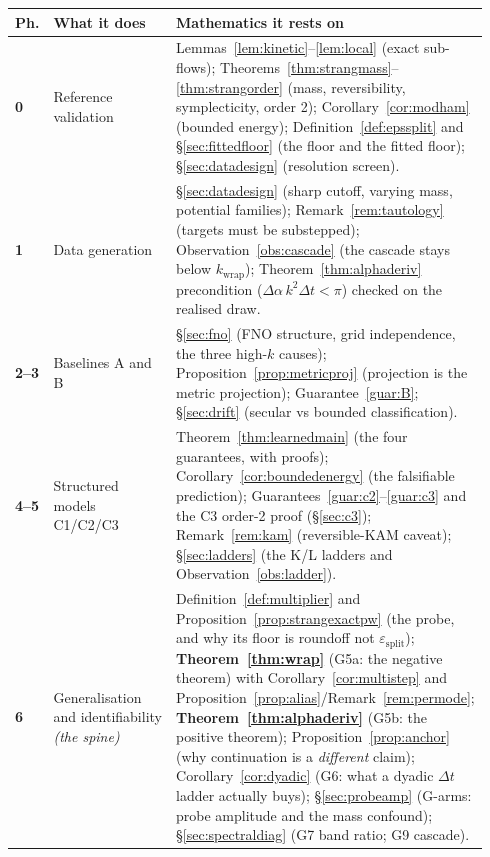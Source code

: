 \documentclass[11pt,a4paper]{article}
\theoremstyle{plain}
\theoremstyle{definition}
\theoremstyle{remark}
\newcommand{\dt}{\Delta t}
\newcommand{\kwrap}{k_{\mathrm{wrap}}}
\newcommand{\epssplit}{\varepsilon_{\mathrm{split}}}
\begin{document}
\begin{center}
\small
\begin{longtable}{@{}p{0.055\linewidth}p{0.30\linewidth}p{0.58\linewidth}@{}}
\toprule
\textbf{Ph.} & \textbf{What it does} & \textbf{Mathematics it rests on}\\
\midrule
\endhead
\textbf{0} & Reference validation & Lemmas~\ref{lem:kinetic}--\ref{lem:local} (exact
sub-flows); Theorems~\ref{thm:strangmass}--\ref{thm:strangorder} (mass, reversibility,
symplecticity, order 2); Corollary~\ref{cor:modham} (bounded energy);
Definition~\ref{def:epssplit} and \S\ref{sec:fittedfloor} (the floor and the fitted floor);
\S\ref{sec:datadesign} (resolution screen).\\[0.4em]

\textbf{1} & Data generation & \S\ref{sec:datadesign} (sharp cutoff, varying mass, potential
families); Remark~\ref{rem:tautology} (targets must be substepped);
Observation~\ref{obs:cascade} (the cascade stays below $\kwrap$);
Theorem~\ref{thm:alphaderiv} precondition ($\Delta\alpha\,k^2\dt<\pi$) checked on the
realised draw.\\[0.4em]

\textbf{2--3} & Baselines A and B & \S\ref{sec:fno} (FNO structure, grid independence,
the three high-$k$ causes); Proposition~\ref{prop:metricproj} (projection is the metric
projection); Guarantee~\ref{guar:B}; \S\ref{sec:drift} (secular vs bounded classification).\\[0.4em]

\textbf{4--5} & Structured models C1/C2/C3 & Theorem~\ref{thm:learnedmain} (the four
guarantees, with proofs); Corollary~\ref{cor:boundedenergy} (the falsifiable prediction);
Guarantees~\ref{guar:c2}--\ref{guar:c3} and the C3 order-2 proof (\S\ref{sec:c3});
Remark~\ref{rem:kam} (reversible-KAM caveat); \S\ref{sec:ladders} (the K/L ladders and
Observation~\ref{obs:ladder}).\\[0.4em]

\textbf{6} & Generalisation and identifiability \emph{(the spine)} &
Definition~\ref{def:multiplier} and Proposition~\ref{prop:strangexactpw} (the probe, and
why its floor is roundoff not $\epssplit$); \textbf{Theorem~\ref{thm:wrap}} (G5a: the
negative theorem) with Corollary~\ref{cor:multistep} and
Proposition~\ref{prop:alias}/Remark~\ref{rem:permode};
\textbf{Theorem~\ref{thm:alphaderiv}} (G5b: the positive theorem);
Proposition~\ref{prop:anchor} (why continuation is a \emph{different} claim);
Corollary~\ref{cor:dyadic} (G6: what a dyadic $\dt$ ladder actually buys);
\S\ref{sec:probeamp} (G-arms: probe amplitude and the mass confound);
\S\ref{sec:spectraldiag} (G7 band ratio; G9 cascade).\\[0.4em]


\end{longtable}
\end{center}
\end{document}
